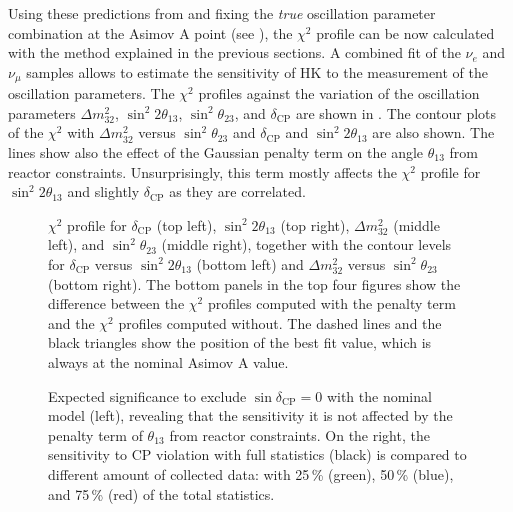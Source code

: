 Using these predictions from  and fixing the \emph{true} oscillation parameter %
combination at the Asimov A point (see ), %
the $\chi^2$ profile can be now calculated with the method explained in the previous sections.
A combined fit of the $\nu_e$ and $\nu_\mu$ samples allows to estimate the sensitivity of HK to the measurement %
of the oscillation parameters.
The $\chi^2$ profiles against the variation of the oscillation parameters %
$\Delta m^2_{32}$, $\sin^2 2\theta_{13}$, $\sin^2 \theta_{23}$, and $\delta_\text{CP}$ %
are shown in .
The contour plots of the $\chi^2$ with $\Delta m_{32}^2$ versus $\sin^2\theta_{23}$ and %
$\delta_\text{CP}$ and $\sin^2 2\theta_{13}$ are also shown.
The lines show also the effect of the Gaussian penalty term on the angle $\theta_{13}$ from reactor constraints.
Unsurprisingly, this term mostly affects the $\chi^2$ profile for $\sin^2 2\theta_{13}$ and slightly $\delta_\text{CP}$ %
as they are correlated.

\begin{figure}
	\centering
	\resizebox{0.49\linewidth}{!}{}
	\resizebox{0.49\linewidth}{!}{}
	\resizebox{0.49\linewidth}{!}{}
	\resizebox{0.49\linewidth}{!}{}
	\resizebox{0.49\linewidth}{!}{}	%
	\resizebox{0.49\linewidth}{!}{}	%
	\caption[$\chi^2$ profiles for $\Delta m_{32}^2$, $\sin^2 2\theta_{13}$, and $\sin\theta_{23}$ with the nominal systematic model]%
		{$\chi^2$ profile for $\delta_\text{CP}$ (top left), $\sin^2 2\theta_{13}$ (top right), %
		$\Delta m_{32}^2$ (middle left), and $\sin^2 \theta_{23}$ (middle right), %
		together with the contour levels for $\delta_\text{CP}$ versus $\sin^2 2\theta_{13}$ (bottom left) %
		and $\Delta m_{32}^2$ versus $\sin^2 \theta_{23}$ (bottom right).
		The bottom panels in the top four figures show the difference between the $\chi^2$ profiles computed %
		with the penalty term and the $\chi^2$ profiles computed without.
		The dashed lines and the black triangles show the position of the best fit value, %
		which is always at the nominal Asimov A value.}
	\label{fig:nominal_profile}
\end{figure}


\begin{figure}
	\centering
	\resizebox{0.49\linewidth}{!}{}
	\resizebox{0.49\linewidth}{!}{}
	\caption[Sensitivity to $\delta_\text{CP}$ with the nominal systematic model]%
		{Expected significance to exclude $\sin\delta_\text{CP} = 0$ with the nominal model (left), %
		revealing that the sensitivity it is not affected by the penalty term of $\theta_{13}$ %
		from reactor constraints.
		On the right, the sensitivity to CP violation with full statistics (black) is compared %
		to different amount of collected data: %
		with 25\,\% (green), 50\,\% (blue), and 75\,\% (red) of the total statistics.}
	\label{fig:nominal_sensitivity}
\end{figure}


